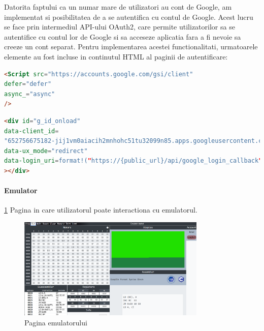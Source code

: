 \documentclass[titlepage,12pt]{article}
\DeclareRobustCommand{\code}[1]{{\ttfamily\small #1}}
\begin{document}
Datorita faptului ca un numar mare de utilizatori au cont de Google, am implementat si posibilitatea de a se autentifica cu contul de Google. Acest lucru se face prin intermediul API-ului OAuth2, care permite utilizatorilor sa se autentifice cu contul lor de Google si sa acceseze aplicatia fara a fi nevoie sa creeze un cont separat.
Pentru implementarea acestei functionalitati, urmatoarele elemente au fost incluse in continutul \code{HTML} al paginii de autentificare:
\begin{lstlisting}[language=HTML,caption={Script necesar Google OAuth2},label={lst:googleauthscript}]
<Script src="https://accounts.google.com/gsi/client"
defer="defer"
async_="async"
/>
\end{lstlisting}
\begin{lstlisting}[language=HTML,caption={Butonul de autentificare cu Google},label={lst:googleauthbutton}]
<div id="g_id_onload"
data-client_id=
"652756675182-jij1vm0aiacih2mnhohc51tu32099n85.apps.googleusercontent.com"
data-ux_mode="redirect"
data-login_uri=format!("https://{public_url}/api/google_login_callback")
></div>
\end{lstlisting}


\paragraph {Emulator} \cref {fig:emulatorpage} Pagina in care utilizatorul poate interactiona cu emulatorul.
\begin{figure}[h!]
\centering
\includegraphics[width=0.8\textwidth]{images/emulatorpage.png}
\caption{Pagina emulatorului}
\label{fig:emulatorpage}
\end{figure}
\end{document}
